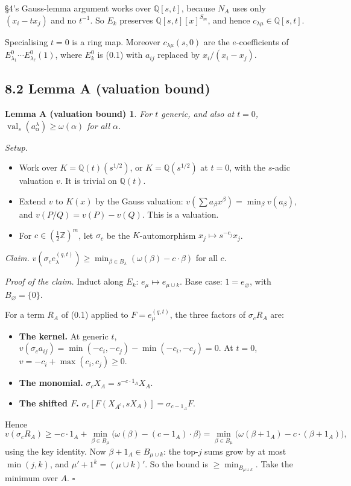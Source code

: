 \documentclass[11pt]{article}
\newtheorem*{lemmaA}{Lemma A (valuation bound)}
\theoremstyle{definition}
\newcommand{\Q}{\mathbb{Q}}
\newcommand{\Z}{\mathbb{Z}}
\newcommand{\val}{\operatorname{val}}
\begin{document}
\S4's Gauss-lemma argument works over $\Q[s,t]$, because $N_A$ uses only $(x_i - t x_j)$ and no $t^{-1}$. So $E_k$ preserves $\Q[s,t][x]^{S_m}$, and hence $c_{\lambda\mu} \in \Q[s,t]$.

Specialising $t = 0$ is a ring map. Moreover $c_{\lambda\mu}(s,0)$ are the $e$-coefficients of $E^0_{\lambda_1}\cdots E^0_{\lambda_\ell}(1)$, where $E^0_k$ is (0.1) with $a_{ij}$ replaced by $x_i/(x_i - x_j)$.

\subsection*{8.2 Lemma A (valuation bound)}

\begin{lemmaA}
For $t$ generic, and also at $t = 0$, $\val_s(a^\lambda_\alpha) \ge \omega(\alpha)$ for all $\alpha$.
\end{lemmaA}

\noindent\emph{Setup.}
\begin{itemize}
\item Work over $K = \Q(t)(s^{1/2})$, or $K = \Q(s^{1/2})$ at $t = 0$, with the $s$-adic valuation $v$. It is trivial on $\Q(t)$.
\item Extend $v$ to $K(x)$ by the Gauss valuation: $v(\sum a_\beta x^\beta) = \min_\beta v(a_\beta)$, and $v(P/Q) = v(P) - v(Q)$. This is a valuation.
\item For $c \in (\tfrac12\Z)^m$, let $\sigma_c$ be the $K$-automorphism $x_j \mapsto s^{-c_j}x_j$.
\end{itemize}

\noindent\emph{Claim.} $v(\sigma_c e_\lambda^{(q,t)}) \ge \min_{\beta\in B_\lambda}(\omega(\beta) - c\cdot\beta)$ for all $c$.

\noindent\emph{Proof of the claim.} Induct along $E_k$: $e_\mu \mapsto e_{\mu\cup k}$. Base case: $1 = e_\varnothing$, with $B_\varnothing = \{0\}$.

For a term $R_A$ of (0.1) applied to $F = e_\mu^{(q,t)}$, the three factors of $\sigma_c R_A$ are:
\begin{itemize}
\item \textbf{The kernel.} At generic $t$, $v(\sigma_c a_{ij}) = \min(-c_i, -c_j) - \min(-c_i, -c_j) = 0$. At $t = 0$, $v = -c_i + \max(c_i, c_j) \ge 0$.
\item \textbf{The monomial.} $\sigma_c X_A = s^{-c\cdot 1_A} X_A$.
\item \textbf{The shifted $F$.} $\sigma_c[F(X_{A^c}, sX_A)] = \sigma_{c-1_A}F$.
\end{itemize}
Hence
\[
v(\sigma_c R_A) \ge -c\cdot 1_A + \min_{\beta\in B_\mu}\bigl(\omega(\beta) - (c-1_A)\cdot\beta\bigr) = \min_{\beta\in B_\mu}\bigl(\omega(\beta+1_A) - c\cdot(\beta+1_A)\bigr),
\]
using the key identity. Now $\beta + 1_A \in B_{\mu\cup k}$: the top-$j$ sums grow by at most $\min(j,k)$, and $\mu' + 1^k = (\mu\cup k)'$. So the bound is $\ge \min_{B_{\mu\cup k}}$. Take the minimum over $A$. \hfill$\square$
\end{document}
